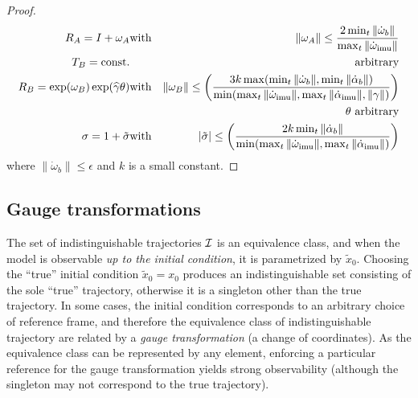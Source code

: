\documentclass[]{article}
\def\w{\omega}
\def\Xw{\tilde{X}}
\def\imu{_\mathrm{imu}}
\begin{document}
\begin{proof}
\begin{eqnarray}
R_A = I + \w_A  & {\rm with} & \| \w_A \| \le \frac{2 \min_t \| \dot \w_b \|}{\max_t \| \dot \w\imu  \|}  \\
T_B = {\rm const.} & & {\rm arbitrary}  \\
R_B = \exp(\w_B)\exp(\widehat \gamma \theta)  & {\rm with} & \| \w_B \| \le \left(\frac{3k\max(\min_t \|\dot \w_b\|, \min_t \|\dot \alpha_b\| )}{\min(\max_t \| \dot \w\imu  \|, \max_t \| \dot \alpha\imu  \|, \| \gamma \|)}\right) \\
& &  \theta \ {\rm arbitrary} \\
\sigma = 1 + \tilde \sigma  & {\rm with} & | \tilde \sigma | \le \left(\frac{2k\min_t \| \dot \alpha_b \|}{\min(\max_t \| \dot \w\imu  \|, \max_t \| \dot \alpha\imu  \|)}\right)
\end{eqnarray}
where $\| \dot \w_b \| \le \epsilon$ and $k$ is a small constant.
\fi
\end{proof}


\subsection{Gauge transformations}

The set of indistinguishable trajectories $\cal I$ is an equivalence class, and when the model is observable {\em up to the initial condition}, it is parametrized by $\tilde x_0$. Choosing the ``true'' initial condition $\tilde x_0 = x_0$ produces an indistinguishable set consisting of the sole ``true'' trajectory, otherwise it is a singleton other than the true trajectory. In some cases, the initial condition corresponds to an arbitrary choice of reference frame, and therefore the equivalence class of indistinguishable trajectory are related by a {\em gauge transformation} (a change of coordinates). As the equivalence class can be represented by any element, enforcing a particular reference for the gauge transformation yields strong observability (although the singleton may not correspond to the true trajectory). 
\end{document}
